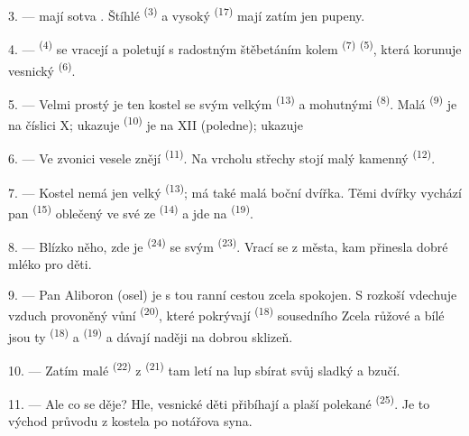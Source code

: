 3. ---  mají sotva . Štíhlé 
\textsuperscript{(3)} a vysoký  \textsuperscript{(17)} mají zatím jen
pupeny.

4. ---  \textsuperscript{(4)} se vracejí a poletují s radostným
štěbetáním kolem  \textsuperscript{(7)} 
\textsuperscript{(5)}, která korunuje vesnický  \textsuperscript{(6)}.

\VUsaut{3.4mm}
\VUsaut{3.0mm}

5. --- Velmi prostý je ten kostel se svým velkým 
\textsuperscript{(13)} a mohutnými  \textsuperscript{(8)}. Malá
 \textsuperscript{(9)} je na číslici X; ukazuje 
 \textsuperscript{(10)} je na XII (poledne); ukazuje 

6. --- Ve zvonici vesele znějí  \textsuperscript{(11)}. Na vrcholu
střechy stojí malý kamenný  \textsuperscript{(12)}.

7. --- Kostel nemá jen velký  \textsuperscript{(13)}; má také malá
boční dvířka. Těmi dvířky vychází pan  \textsuperscript{(15)} oblečený
ve své  ze  \textsuperscript{(14)} a jde na
 \textsuperscript{(19)}.

8. --- Blízko něho, zde je  \textsuperscript{(24)} se svým
 \textsuperscript{(23)}. Vrací se z města, kam přinesla dobré mléko pro
děti.

\VUsaut{4.0mm}
\VUsaut{3.4mm}

9. --- Pan Aliboron (osel) je s tou ranní cestou zcela spokojen. S rozkoší vdechuje
vzduch provoněný vůní  \textsuperscript{(20)}, které pokrývají
 \textsuperscript{(18)} sousedního 
Zcela růžové a bílé jsou ty  \textsuperscript{(18)} a
 \textsuperscript{(19)} a dávají naději na dobrou sklizeň.

10. --- Zatím malé  \textsuperscript{(22)} z 
\textsuperscript{(21)} tam letí na lup sbírat svůj sladký  a bzučí.

11. --- Ale co se děje? Hle, vesnické děti přibíhají a plaší polekané 
\textsuperscript{(25)}. Je to východ průvodu z kostela po  notářova syna.

